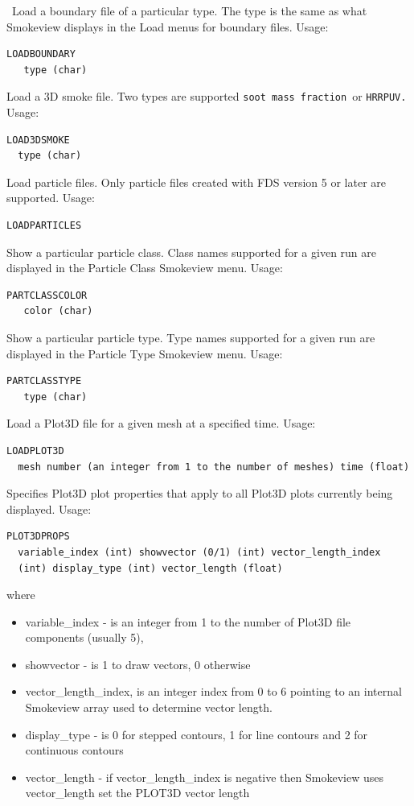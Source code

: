 \documentclass[11pt,twoside]{book}
\newcommand{\hitem}[1]{\item[{\bf #1} \hfill]}
\begin{document}
\hitem{LOADBOUNDARY}\ Load a boundary file of a particular type.
The type is the same as what Smokeview displays in the Load menus for boundary files.
Usage:
\begin{lstlisting}
LOADBOUNDARY
   type (char)
\end{lstlisting}

\hitem{LOAD3DSMOKE}
Load a 3D smoke file.  Two types are supported {\tt soot mass fraction}\ or {\tt HRRPUV.}
Usage:
\begin{lstlisting}
LOAD3DSMOKE
  type (char)
\end{lstlisting}

\hitem{LOADPARTICLES}Load particle files.  Only particle files created with FDS version 5 or
later are supported.
Usage:
\begin{lstlisting}
LOADPARTICLES
\end{lstlisting}

\hitem{PARTCLASSCOLOR}Show a particular particle class.  Class names supported for a given
run are displayed in the Particle Class Smokeview menu.
Usage:
\begin{lstlisting}
PARTCLASSCOLOR
   color (char)
\end{lstlisting}

\hitem{PARTCLASSTYPE}Show a particular particle type.  Type names supported for a given
run are displayed in the Particle Type Smokeview menu.
Usage:
\begin{lstlisting}
PARTCLASSTYPE
   type (char)
\end{lstlisting}

\hitem{LOADPLOT3D}Load a Plot3D file for a given mesh at a specified time.
Usage:
\begin{lstlisting}
LOADPLOT3D
  mesh number (an integer from 1 to the number of meshes) time (float)
\end{lstlisting}

\hitem{PLOT3DPROPS}Specifies Plot3D plot properties that
apply to all Plot3D plots currently being displayed.
Usage:
\begin{lstlisting}
PLOT3DPROPS
  variable_index (int) showvector (0/1) (int) vector_length_index
  (int) display_type (int) vector_length (float)
\end{lstlisting}
where
\begin{itemize}
\item variable\_index - is an integer from 1 to the number of
Plot3D file components (usually 5),
\item showvector - is 1 to draw vectors, 0 otherwise
\item vector\_length\_index, is an integer index from 0 to 6
pointing to an internal Smokeview array used to determine vector length.
\item display\_type - is 0 for stepped contours, 1 for line
contours and 2 for continuous contours
\item vector\_length - if vector\_length\_index is negative
then Smokeview uses vector\_length set the PLOT3D vector length
\end{itemize}
\end{document}
